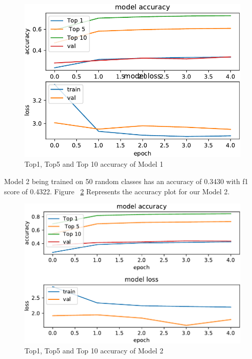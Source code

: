 \documentclass[conference]{IEEEtran}
\begin{document}
\begin{figure}[h]
\centerline
{\includegraphics[width=\columnwidth]{images/acc_loss_101-cropped.pdf}}
\caption{Top1, Top5 and Top 10 accuracy of Model 1 }
\label{fig:acc_loss_101}
\end{figure}

\FloatBarrier
Model 2 being trained on 50 random classes has an accuracy of 0.3430 with f1 score of 0.4322.
Figure ~\ref{fig:acc_loss_50} Represents the accuracy plot for our Model 2.
\begin{figure}[h]
\centerline
{\includegraphics[width=\columnwidth]{images/acc_loss_50-cropped.pdf}}
\caption{Top1, Top5 and Top 10 accuracy of Model 2 }
\label{fig:acc_loss_50}
\end{figure}
\end{document}
